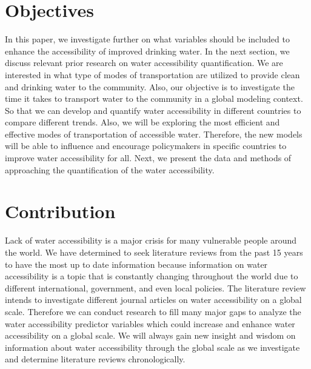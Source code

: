 \documentclass[10pt,twoside]{article}
\numberwithin{equation}{section}
\newcommand{\?}{\stackrel{?}{=}}
\newcommand{\rd}{\color{red}}
\begin{document}
\section{Objectives}
In this paper, we investigate further on what
variables should be included to enhance the accessibility of improved drinking water.
In the next section, we discuss relevant prior research on water accessibility quantification. We are interested in what type of modes of
transportation are utilized to provide clean and drinking water to the community. Also, our objective is to investigate
the time it takes to transport water to the community in a global modeling context. So that we can develop and quantify
water accessibility in different countries to compare different trends. Also, we will be exploring the most efficient
and effective modes of transportation of accessible water. Therefore, the new models will be able to influence and
encourage policymakers in specific countries to improve water accessibility for all. Next, we present the data and methods of approaching the quantification of the water accessibility. 
 
\section{Contribution}
Lack of water accessibility is a major crisis for many vulnerable people around the world. We have determined to seek literature reviews from the past 15 years to have the most up to date information because information on water accessibility is a topic that is constantly changing throughout the world due to different international, government, and even local policies. The literature review intends to investigate different journal articles on water accessibility on a global scale. Therefore we can conduct research to fill many major gaps to analyze the water accessibility predictor variables which could increase and enhance water accessibility on a global scale. We will always gain new insight and wisdom on information about water accessibility through the global scale as we investigate and determine literature reviews chronologically. 
\end{document}
